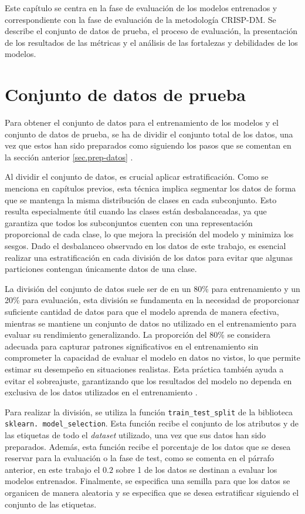 Este capítulo se centra en la fase de evaluación de los modelos entrenados y correspondiente con la fase de evaluación de la metodología CRISP-DM. Se describe el conjunto de datos de prueba, el proceso de evaluación, la presentación de los resultados de las métricas y el análisis de las fortalezas y debilidades de los modelos.

\section{Conjunto de datos de prueba}
Para obtener el conjunto de datos para el entrenamiento de los modelos y el conjunto de datos de prueba, se ha de dividir el conjunto total de los datos, una vez que estos han sido preparados como siguiendo los pasos que se comentan en la sección anterior \ref{sec.prep-datos} . 


Al dividir el conjunto de datos, es crucial aplicar estratificación. Como se menciona en capítulos previos, esta técnica implica segmentar los datos de forma que se mantenga la misma distribución de clases en cada subconjunto. Esto resulta especialmente útil cuando las clases están desbalanceadas, ya que garantiza que todos los subconjuntos cuenten con una representación proporcional de cada clase, lo que mejora la precisión del modelo y minimiza los sesgos. Dado el desbalanceo observado en los datos de este trabajo, es esencial realizar una estratificación en cada división de los datos para evitar que algunas particiones contengan únicamente datos de una clase.


La división del conjunto de datos suele ser de en un 80\% para entrenamiento y un 20\% para evaluación, esta división se fundamenta en la necesidad de proporcionar suficiente cantidad de datos para que el modelo aprenda de manera efectiva, mientras se mantiene un conjunto de datos no utilizado en el entrenamiento para evaluar su rendimiento generalizando. La proporción del 80\% se considera adecuada para capturar patrones significativos en el entrenamiento sin comprometer la capacidad de evaluar el modelo en datos no vistos, lo que permite estimar su desempeño en situaciones realistas. Esta práctica también ayuda a evitar el sobreajuste, garantizando que los resultados del modelo no dependa en exclusiva de los datos utilizados en el entrenamiento \cite{bishop2006pattern}.

Para realizar la división, se utiliza la función \texttt{train\_test\_split} de la biblioteca \texttt{sklearn. model\_selection}. Esta función recibe el conjunto de los atributos y de las etiquetas de todo el \textit{dataset} utilizado, una vez que sus datos han sido preparados. Además, esta función recibe el porcentaje de los datos que se desea reservar para la evaluación o la fase de test, como se comenta en el párrafo anterior, en este trabajo el $0.2$ sobre 1 de los datos se destinan a evaluar los modelos entrenados. Finalmente, se especifica una semilla para que los datos se organicen de manera aleatoria y se especifica que se desea estratificar siguiendo el conjunto de las etiquetas.

